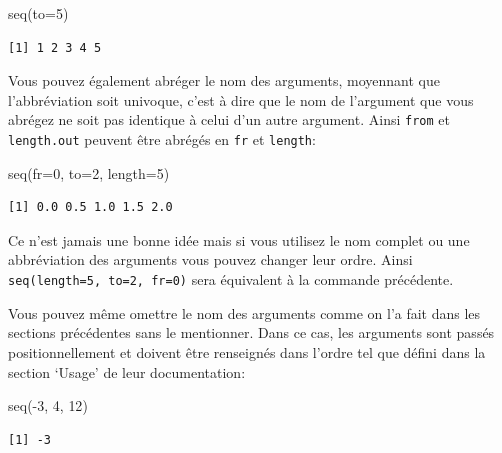 \documentclass[
  letterpaper,
  DIV=11,
  numbers=noendperiod]{scrreprt}
\newenvironment{Shaded}{\begin{snugshade}}{\end{snugshade}}
\newcommand{\AttributeTok}[1]{\textcolor[rgb]{0.40,0.45,0.13}{#1}}
\newcommand{\DecValTok}[1]{\textcolor[rgb]{0.68,0.00,0.00}{#1}}
\newcommand{\FunctionTok}[1]{\textcolor[rgb]{0.28,0.35,0.67}{#1}}
\newcommand{\NormalTok}[1]{\textcolor[rgb]{0.00,0.23,0.31}{#1}}
\newcommand{\SpecialCharTok}[1]{\textcolor[rgb]{0.37,0.37,0.37}{#1}}
\begin{document}
\begin{Shaded}
\begin{Highlighting}[]
\FunctionTok{seq}\NormalTok{(}\AttributeTok{to=}\DecValTok{5}\NormalTok{)}
\end{Highlighting}
\end{Shaded}

\begin{verbatim}
[1] 1 2 3 4 5
\end{verbatim}

Vous pouvez également abréger le nom des arguments, moyennant que
l'abbréviation soit univoque, c'est à dire que le nom de l'argument que
vous abrégez ne soit pas identique à celui d'un autre argument. Ainsi
\texttt{from} et \texttt{length.out} peuvent être abrégés en \texttt{fr}
et \texttt{length}:

\begin{Shaded}
\begin{Highlighting}[]
\FunctionTok{seq}\NormalTok{(}\AttributeTok{fr=}\DecValTok{0}\NormalTok{, }\AttributeTok{to=}\DecValTok{2}\NormalTok{, }\AttributeTok{length=}\DecValTok{5}\NormalTok{)}
\end{Highlighting}
\end{Shaded}

\begin{verbatim}
[1] 0.0 0.5 1.0 1.5 2.0
\end{verbatim}

Ce n'est jamais une bonne idée mais si vous utilisez le nom complet ou
une abbréviation des arguments vous pouvez changer leur ordre. Ainsi
\texttt{seq(length=5,\ to=2,\ fr=0)} sera équivalent à la commande
précédente.

Vous pouvez même omettre le nom des arguments comme on l'a fait dans les
sections précédentes sans le mentionner. Dans ce cas, les arguments sont
passés positionnellement et doivent être renseignés dans l'ordre tel que
défini dans la section `Usage' de leur documentation:

\begin{Shaded}
\begin{Highlighting}[]
\FunctionTok{seq}\NormalTok{(}\SpecialCharTok{{-}}\DecValTok{3}\NormalTok{, }\DecValTok{4}\NormalTok{, }\DecValTok{12}\NormalTok{)}
\end{Highlighting}
\end{Shaded}

\begin{verbatim}
[1] -3
\end{verbatim}
\end{document}
